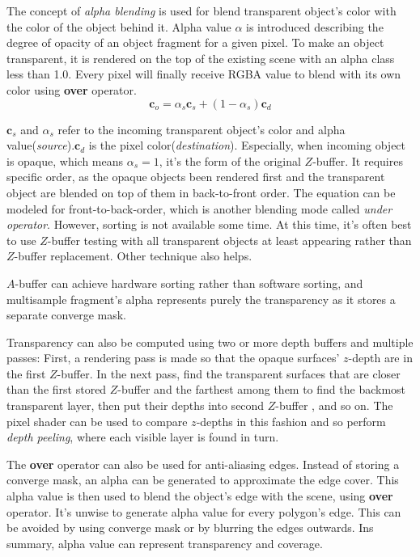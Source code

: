 \documentclass[10pt, a4paper]{article}
\begin{document}
            The concept of \emph{alpha blending} is used for blend transparent object's color with the color of the object behind it. Alpha value $\alpha$ is introduced describing the degree of opacity of an object fragment for a given pixel. To make an object transparent, it is rendered on the top of the existing scene with an alpha class less than 1.0. Every pixel will finally receive RGBA value to blend with its own color using \textbf{over} operator.
            $$\textbf{c}_o = \alpha_s\textbf{c}_s + (1 - \alpha_s)\textbf{c}_d$$
        
            $\textbf{c}_s$ and $\alpha_s$ refer to the incoming transparent object's color and alpha value(\emph{source}).$\textbf{c}_d$ is the pixel color(\emph{destination}). Especially, when incoming object is opaque, which means $\alpha_s = 1$, it's the form of the original $Z$-buffer. It requires specific order, as the opaque objects been rendered first and the transparent object are blended on top of them in back-to-front order. The equation can be modeled for front-to-back-order, which is another blending mode called \emph{under operator}. However, sorting is not available some time. At this time, it's often best to use $Z$-buffer testing with all transparent objects at least appearing rather than $Z$-buffer replacement. Other technique also helps. 

            $A$-buffer can achieve hardware sorting rather than software sorting, and multisample fragment's alpha represents purely the transparency as it stores a separate converge mask. 

            Transparency can also be computed using two or more depth buffers and multiple passes: First, a rendering pass is made so that the opaque surfaces' $z$-depth are in the first $Z$-buffer. In the next pass, find the transparent surfaces that are closer than the first stored $Z$-buffer and the farthest among them to find the backmost transparent layer, then put their depths into second $Z$-buffer , and so on. The pixel shader can be used to compare $z$-depths in this fashion and so perform \emph{depth peeling}, where each visible layer is found in turn. 

            The \textbf{over} operator can also be used for anti-aliasing edges. Instead of storing a converge mask, an alpha can be generated to approximate the edge cover. This alpha value is then used to blend the object's edge with the scene, using \textbf{over} operator. It's unwise to generate alpha value for every polygon's edge. This can be avoided by using converge mask or by blurring the edges outwards. Ins summary, alpha value can represent transparency and coverage. 
            
\end{document}
